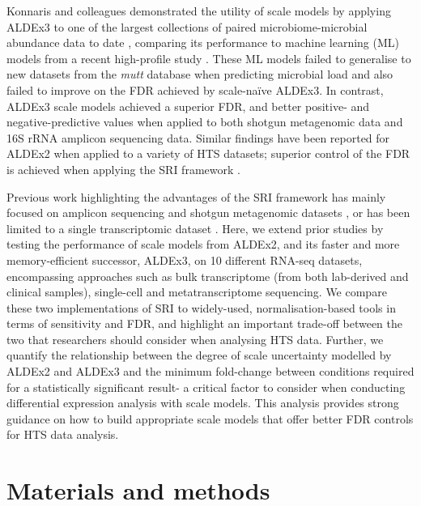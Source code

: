 \documentclass[10pt,letterpaper]{article}
\begin{document}
Konnaris and colleagues demonstrated the utility of scale models by applying ALDEx3 to one of the largest collections of paired microbiome-microbial abundance data to date \cite{konnaris_uncertainty_2025}, comparing its performance to machine learning (ML) models from a recent high-profile study \cite{nishijima_fecal_2025}. These ML models failed to generalise to new datasets from the \textit{mutt} database \cite{konnaris_uncertainty_2025} when predicting microbial load and also failed to improve on the FDR achieved by scale-na\"ive ALDEx3. In contrast, ALDEx3 scale models achieved a superior FDR, and better positive- and negative-predictive values when applied to both shotgun metagenomic data and 16S rRNA amplicon sequencing data. Similar findings have been reported for ALDEx2 when applied to a variety of HTS datasets; superior control of the FDR is achieved when applying the SRI framework \cite{gloor_explicit_2025}.

Previous work highlighting the advantages of the SRI framework has mainly focused on amplicon sequencing and shotgun metagenomic datasets \cite{konnaris_uncertainty_2025}, or has been limited to a single transcriptomic dataset \cite{gloor_explicit_2025}. Here, we extend prior studies by testing the performance of scale models from ALDEx2, and its faster and more memory-efficient successor, ALDEx3, on 10 different RNA-seq datasets, encompassing approaches such as bulk transcriptome (from both lab-derived and clinical samples), single-cell and metatranscriptome sequencing. We compare these two implementations of SRI to widely-used, normalisation-based tools in terms of sensitivity and FDR, and highlight an important trade-off between the two that researchers should consider when analysing HTS data. Further, we quantify the relationship between the degree of scale uncertainty modelled by ALDEx2 and ALDEx3 and the minimum fold-change between conditions required for a statistically significant result- a critical factor to consider when conducting differential expression analysis with scale models. This analysis provides strong guidance on how to build appropriate scale models that offer better FDR controls for HTS data analysis.


\section*{Materials and methods}
\end{document}
